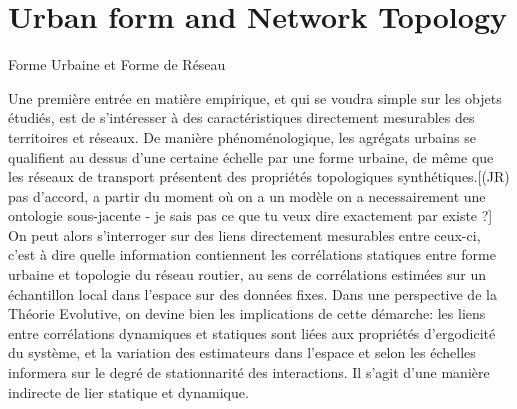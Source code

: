 

\newpage





\section{Urban form and Network Topology}{Forme Urbaine et Forme de Réseau}




\label{sec:staticcorrelations}





Une première entrée en matière empirique, et qui se voudra simple sur les objets étudiés, est de s'intéresser à des caractéristiques directement mesurables des territoires et réseaux. De manière phénoménologique, les agrégats urbains se qualifient au dessus d'une certaine échelle par une forme urbaine, de même que les réseaux de transport présentent des propriétés topologiques synthétiques.[(JR) pas d'accord, a partir du moment où on a un modèle on a necessairement une ontologie sous-jacente - je sais pas ce que tu veux dire exactement par existe ?] On peut alors s'interroger sur des liens directement mesurables entre ceux-ci, c'est à dire quelle information contiennent les corrélations statiques entre forme urbaine et topologie du réseau routier, au sens de corrélations estimées sur un échantillon local dans l'espace sur des données fixes. Dans une perspective de la Théorie Evolutive, on devine bien les implications de cette démarche: les liens entre corrélations dynamiques et statiques sont liées aux propriétés d'ergodicité du système, et la variation des estimateurs dans l'espace et selon les échelles informera sur le degré de stationnarité des interactions. Il s'agit d'une manière indirecte de lier statique et dynamique. 


